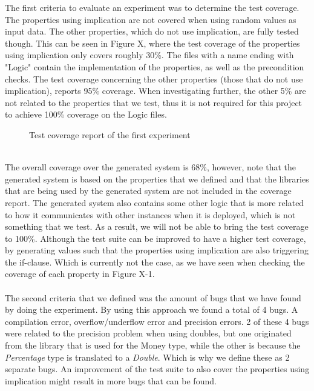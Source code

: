 The first criteria to evaluate an experiment was to determine the test coverage. The properties using implication are not covered when using random values as input data. The other properties, which do not use implication, are fully tested though. This can be seen in Figure X, where the test coverage of the properties using implication only covers roughly 30\%. The files with a name ending with "Logic" contain the implementation of the properties, as well as the precondition checks. The test coverage concerning the other properties (those that do not use implication), reports 95\% coverage. When investigating further, the other 5\% are not related to the properties that we test, thus it is not required for this project to achieve 100\% coverage on the Logic files.\\
\begin{figure}[h!]
\caption{Test coverage report of the first experiment}
\label{fig:ch5_eval_experiment1}
\centering
\end{figure}
\\
The overall coverage over the generated system is 68\%, however, note that the generated system is based on the properties that we defined and that the libraries that are being used by the generated system are not included in the coverage report. The generated system also contains some other logic that is more related to how it communicates with other instances when it is deployed, which is not something that we test. As a result, we will not be able to bring the test coverage to 100\%. Although the test suite can be improved to have a higher test coverage, by generating values such that the properties using implication are also triggering the if-clause. Which is currently not the case, as we have seen when checking the coverage of each property in Figure X-1.\\
\\
The second criteria that we defined was the amount of bugs that we have found by doing the experiment. By using this approach we found a total of 4 bugs. A compilation error, overflow/underflow error and precision errors. 2 of these 4 bugs were related to the precision problem when using doubles, but one originated from the library that is used for the Money type, while the other is because the \textit{Percentage} type is translated to a \textit{Double}. Which is why we define these as 2 separate bugs. An improvement of the test suite to also cover the properties using implication might result in more bugs that can be found.

